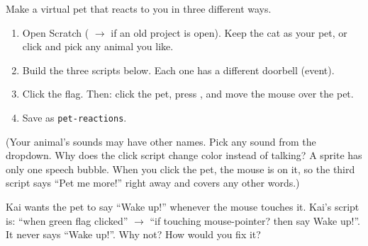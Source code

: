 \namedateline

\begin{core}
Make a virtual pet that reacts to you in three different ways.
\begin{enumerate}[leftmargin=1.4em,itemsep=1pt]
  \item Open Scratch ( $\rightarrow$  if an old project is open). Keep the cat as your pet, or click  and pick any animal you like.
  \item Build the three scripts below. Each one has a different doorbell (event).
  \item Click the flag. Then: click the pet, press , and move the mouse over the pet.
  \item Save as \texttt{pet-reactions}.
\end{enumerate}
\begin{center}
\begin{scratch}[scale=0.78]
\end{scratch}
\hspace{0.5cm}
\begin{scratch}[scale=0.78]
\end{scratch}

\medskip
\begin{scratch}[scale=0.78,else word=else]
\end{scratch}
\end{center}
{\small (Your animal's sounds may have other names. Pick any sound from the dropdown. Why does the click script change color instead of talking? A sprite has only one speech bubble. When you click the pet, the mouse is on it, so the third script says \enquote{Pet me more!} right away and covers any other words.)}
\end{core}

\begin{challenge}
Kai wants the pet to say \enquote{Wake up!} whenever the mouse touches it. Kai's script is:
\enquote{when green flag clicked} $\rightarrow$ \enquote{if touching mouse-pointer? then say Wake up!}. It never says \enquote{Wake up!}.
Why not? How would you fix it?
\end{challenge}

